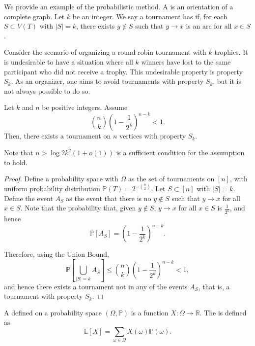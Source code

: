 We provide an example of the probabilistic method.
A  is an orientation of a complete graph.
Let \(k\) be an integer.
We say a tournament has  if,
for each \(S \subset V(T)\) with \(|S| = k\), 
there exists \(y \notin S\) such that \(y \to x\) is an arc for all \(x \in S\).

Consider the scenario of organizing a round-robin tournament with \(k\) trophies.
It is undesirable to have a situation where all \(k\) winners have lost to the same participant who did not receive a trophy.
This undesirable property is property \(S_k\).
As an organizer, one aims to avoid tournaments with property \(S_k\), but it is not always possible to do so.

\begin{theorem}
    Let \(k\) and \(n\) be positive integers.
    Assume
    \begin{equation}
        \binom{n}{k} \left( 1 - \frac{1}{2^k} \right)^{n-k} < 1.
    \end{equation}
    Then, there exists a tournament on \(n\) vertices with property \(S_k\).
\end{theorem}

Note that \(n > \log 2 k^2 (1 + o(1))\) is a sufficient condition for the assumption to hold.

\begin{proof}
    Define a probability space with \(\Omega\) as the set of tournaments on \([n]\),
    with uniform probability distribution \(\mathbb{P}(T) = 2^{-\binom{n}{2}}\).
    Let \(S \subset [n]\) with \(|S| = k\).
    Define the event \(A_S\) as the event that there is no \(y \notin S\) such that \(y \to x\) for all \(x \in S\).
    Note that the probability that, given \(y \notin S\), \(y \to x\) for all \(x \in S\) is \(\frac{1}{2^k}\), and hence
    \begin{equation}
        \mathbb{P}[A_S] = \left( 1 - \frac{1}{2^k} \right)^{n-k}.
    \end{equation}

    Therefore, using the Union Bound,
    \begin{equation}
        \mathbb{P}\left[ \bigcup_{|S| = k} A_S \right] \leq \binom{n}{k} \left( 1 - \frac{1}{2^k} \right)^{n-k} < 1,
    \end{equation}
    and hence there exists a tournament not in any of the events \(A_S\), that is, a tournament with property \(S_k\).
\end{proof}

\begin{definition}
    A  defined on a probability space \((\Omega, \mathbb{P})\) is a function \(X : \Omega \to \mathbb{R}\).
    The  is defined as
    \begin{equation}
        \mathbb{E}[X] = \sum_{\omega \in \Omega} X(\omega) \mathbb{P}(\omega).
    \end{equation}
\end{definition}

